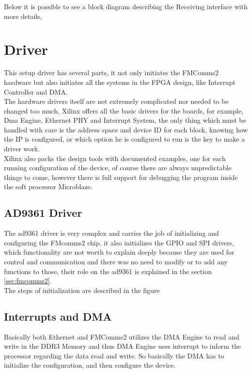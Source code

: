 Below it is possible to see a block diagram describing the Receiving interface with
more details,

\section{Driver}

This setup driver has several parts, it not only initiates the FMComms2 hardware
but also initiates all the systems in the FPGA design, like Interrupt Controller
and DMA.\\

The hardware drivers itself are not extremely complicated nor needed to be changed
too much, Xilinx offers all the basic drivers for the boards, for example, Dma Engine,
Ethernet PHY and Interrupt System, the only thing which must be handled with care is
the address space and device ID for each block, knowing how the IP is configured,
or which option he is configured to run is the key to make a driver work.\\

Xilinx also packs the design tools with documented examples, one for each running
configuration of the device, of course there are always unpredictable things to come,
however there is full support for debugging the program inside the soft processor
Microblaze.

\subsection{AD9361 Driver}

The ad9361 driver is very complex and carries the job of initializing and configuring
the FMcomms2 chip, it also initializes the GPIO and SPI drivers, which functionality
are not worth to explain deeply because they are used for control and communication
and there was no need to modify or to add any functions to those, their role on the
ad9361 is explained in the section \ref{sec:fmcomms2}.\\

The steps of initialization are described in the figure %


\subsection{Interrupts and DMA}

Basically both Ethernet and FMComms2 utilizes the DMA Engine to read and write in
the DDR3 Memory and thus DMA Engine uses interrupt to inform the processor regarding
the data read and write. So basically the DMA has to initialize the configuration,
and then configure the device.\\

